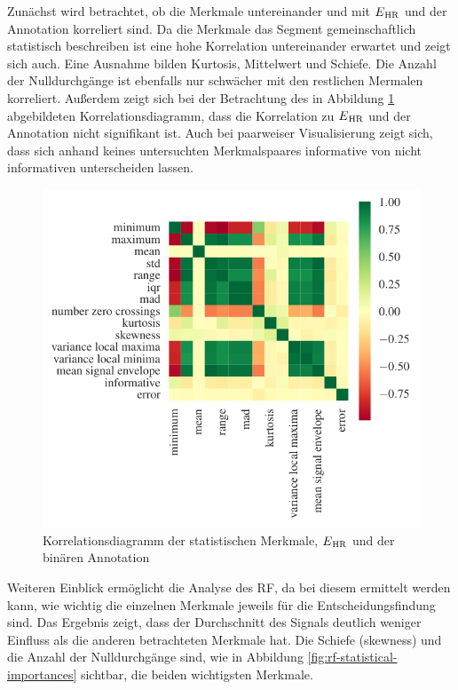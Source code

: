 Zunächst wird betrachtet, ob die Merkmale untereinander und mit $E\textsubscript{HR}$ und der Annotation korreliert sind. Da die Merkmale das Segment gemeinschaftlich statistisch beschreiben ist eine hohe Korrelation untereinander erwartet und zeigt sich auch. Eine Ausnahme bilden Kurtosis, Mittelwert und Schiefe. Die Anzahl der Nulldurchgänge ist ebenfalls nur schwächer mit den restlichen Mermalen korreliert. Außerdem zeigt sich bei der Betrachtung des in Abbildung \ref{fig:corr-heatmap-statistical} abgebildeten Korrelationsdiagramm, dass die Korrelation zu $E\textsubscript{HR}$ und der Annotation nicht signifikant ist. Auch bei paarweiser Visualisierung zeigt sich, dass sich anhand keines untersuchten Merkmalspaares informative von nicht informativen unterscheiden lassen.

\begin{figure}[H]
	\centering
	\includegraphics[scale=0.95]{pic/corr-heatmap-statistical.pdf}
	\caption{Korrelationsdiagramm der statistischen Merkmale, $E\textsubscript{HR}$ und der binären Annotation}
	\label{fig:corr-heatmap-statistical}
\end{figure}

Weiteren Einblick ermöglicht die Analyse des \ac{RF}, da bei diesem ermittelt werden kann, wie wichtig die einzelnen Merkmale jeweils für die Entscheidungsfindung sind. Das Ergebnis zeigt, dass der Durchschnitt des Signals deutlich weniger Einfluss als die anderen betrachteten Merkmale hat. Die Schiefe (skewness) und die Anzahl der Nulldurchgänge sind, wie in Abbildung \ref{fig:rf-statistical-importances} sichtbar, die beiden wichtigsten Merkmale. 

